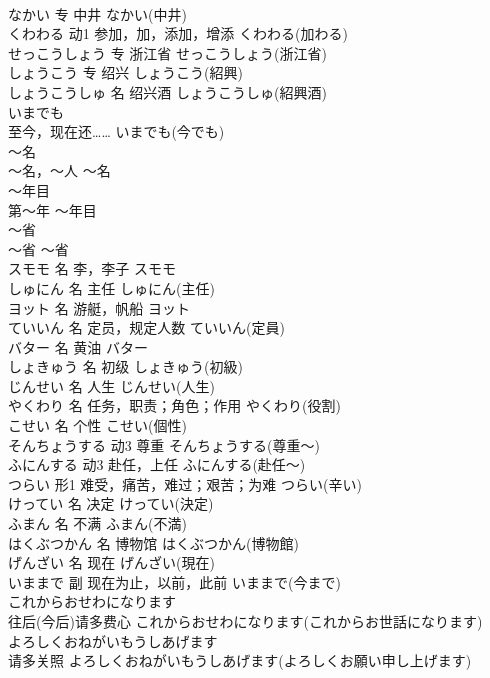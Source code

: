 \documentclass[8pt]{extreport}
\begin{document}
\begin{CJK}{UTF8}{min}
\\	なかい	专	中井	なかい(中井)	
\\	くわわる	动1	参加，加，添加，增添	くわわる(加わる)	
\\	せっこうしょう	专	浙江省	せっこうしょう(浙江省)	
\\	しょうこう	专	绍兴	しょうこう(紹興)	
\\	しょうこうしゅ	名	绍兴酒	しょうこうしゅ(紹興酒)	
\\	いまでも	
\\	至今，现在还……	いまでも(今でも)	
\\	～名	
\\	～名，～人	～名	
\\	～年目	
\\	第～年	～年目	
\\	～省	
\\	～省	～省	
\\	スモモ	名	李，李子	スモモ	
\\	しゅにん	名	主任	しゅにん(主任)	
\\	ヨット	名	游艇，帆船	ヨット	
\\	ていいん	名	定员，规定人数	ていいん(定員)	
\\	バター	名	黄油	バター	
\\	しょきゅう	名	初级	しょきゅう(初級)	
\\	じんせい	名	人生	じんせい(人生)	
\\	やくわり	名	任务，职责；角色；作用	やくわり(役割)	
\\	こせい	名	个性	こせい(個性)	
\\	そんちょうする	动3	尊重	そんちょうする(尊重～)	
\\	ふにんする	动3	赴任，上任	ふにんする(赴任～)	
\\	つらい	形1	难受，痛苦，难过；艰苦；为难	つらい(辛い)	
\\	けってい	名	决定	けってい(決定)	
\\	ふまん	名	不满	ふまん(不満)	
\\	はくぶつかん	名	博物馆	はくぶつかん(博物館)	
\\	げんざい	名	现在	げんざい(現在)	
\\	いままで	副	现在为止，以前，此前	いままで(今まで)	
\\	これからおせわになります	
\\	往后(今后)请多费心	これからおせわになります(これからお世話になります)	
\\	よろしくおねがいもうしあげます	
\\	请多关照	よろしくおねがいもうしあげます(よろしくお願い申し上げます)	

\end{CJK}
\end{document}
